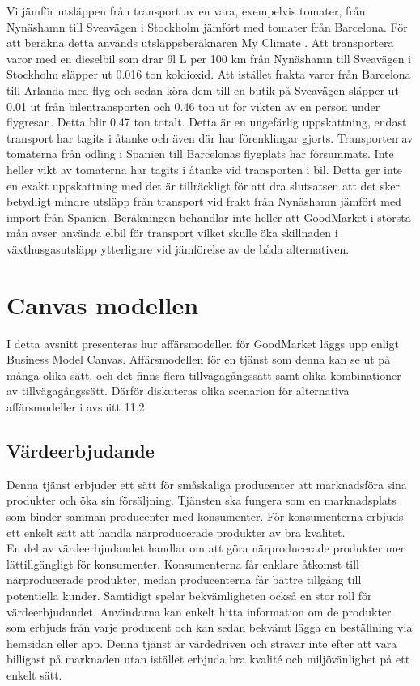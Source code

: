 \documentclass[10pt,a4paper,oneside]{article}
\begin{document}
Vi jämför utsläppen från transport av en vara, exempelvis tomater, från Nynäshamn till Sveavägen i Stockholm jämfört med tomater från Barcelona. För att beräkna detta används utsläppsberäknaren My Climate \cite{MyClimate}. Att transportera varor med en dieselbil som drar 6l L per 100 km från Nynäshamn till Sveavägen i Stockholm släpper ut 0.016 ton koldioxid. Att istället frakta varor från Barcelona till Arlanda med flyg och sedan köra dem till en butik på Sveavägen släpper ut 0.01 ut från bilentransporten och 0.46 ton ut för vikten av en person under flygresan. Detta blir 0.47 ton totalt. Detta är en ungefärlig uppskattning, endast transport har tagits i åtanke och även där har förenklingar gjorts. Transporten av tomaterna från odling i Spanien till Barcelonas flygplats har försummats. Inte heller vikt av tomaterna har tagits i åtanke vid transporten i bil. Detta ger inte en exakt uppskattning med det är tillräckligt för att dra slutsatsen att det sker betydligt mindre utsläpp från transport vid frakt från Nynäshamn jämfört med import från Spanien. Beräkningen behandlar inte heller att GoodMarket i största mån avser använda elbil för transport vilket skulle öka skillnaden i växthusgasutsläpp ytterligare vid jämförelse av de båda alternativen.

\newpage

\section{Canvas modellen}
I detta avsnitt presenteras hur affärsmodellen för GoodMarket läggs upp enligt Business Model Canvas. Affärsmodellen för en tjänst som denna kan se ut på många olika sätt, och det finns flera tillvägagångssätt samt olika kombinationer av tillvägagångssätt. Därför diskuteras olika scenarion för alternativa affärsmodeller i avsnitt 11.2. 

\subsection{Värdeerbjudande}
Denna tjänst erbjuder ett sätt för småskaliga producenter att marknadsföra sina produkter och öka sin försäljning. Tjänsten ska fungera som en marknadsplats som binder samman producenter med konsumenter. För konsumenterna erbjuds ett enkelt sätt att handla närproducerade produkter av bra kvalitet. \\

En del av värdeerbjudandet handlar om att göra närproducerade produkter mer lättillgängligt för konsumenter. Konsumenterna får enklare åtkomst till närproducerade produkter, medan producenterna får bättre tillgång till potentiella kunder. Samtidigt spelar bekvämligheten också en stor roll för värdeerbjudandet. Användarna kan enkelt hitta information om de produkter som erbjuds från varje producent och kan sedan bekvämt lägga en beställning via hemsidan eller app. Denna tjänst är värdedriven och strävar inte efter att vara billigast på marknaden utan istället erbjuda bra kvalité och miljövänlighet på ett enkelt sätt.  
\end{document}
